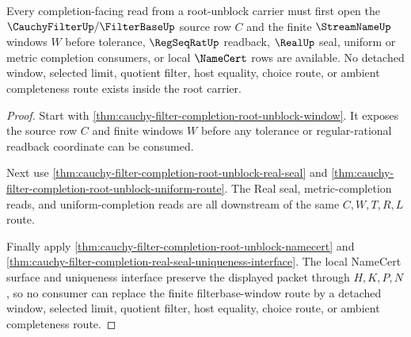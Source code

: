 \begin{theorem}
\label{thm:cauchy-filter-completion-filterbase-window-exhaustion}
Every completion-facing read from a root-unblock carrier must first open the $\CauchyFilterUp/\FilterBaseUp$ source row $C$ and the finite $\StreamNameUp$ windows $W$ before tolerance, $\RegSeqRatUp$ readback, $\RealUp$ seal, uniform or metric completion consumers, or local $\NameCert$ rows are available. No detached window, selected limit, quotient filter, host equality, choice route, or ambient completeness route exists inside the root carrier.
\end{theorem}
\begin{proof}
Start with \autoref{thm:cauchy-filter-completion-root-unblock-window}. It exposes the source row $C$ and finite windows $W$ before any tolerance or regular-rational readback coordinate can be consumed.

Next use \autoref{thm:cauchy-filter-completion-root-unblock-real-seal} and \autoref{thm:cauchy-filter-completion-root-unblock-uniform-route}. The Real seal, metric-completion reads, and uniform-completion reads are all downstream of the same $C,W,T,R,L$ route.

Finally apply \autoref{thm:cauchy-filter-completion-root-unblock-namecert} and \autoref{thm:cauchy-filter-completion-real-seal-uniqueness-interface}. The local NameCert surface and uniqueness interface preserve the displayed packet through $H,K,P,N$, so no consumer can replace the finite filterbase-window route by a detached window, selected limit, quotient filter, host equality, choice route, or ambient completeness route.
\end{proof}

